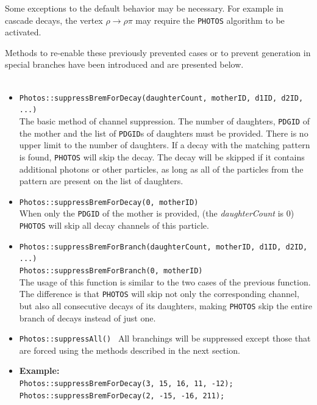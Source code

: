 \documentclass[]{Photos_interface_design}
\begin{document}
Some exceptions to the default behavior may be necessary. For example
in cascade decays, the vertex $\rho \to \rho \pi$ may require the
{\tt PHOTOS} algorithm to be activated.

Methods to re-enable these previously prevented cases or to prevent generation in special
branches have been introduced and are presented below. \\ \\ 


\begin{itemize}
 \item {\tt Photos::suppressBremForDecay(daughterCount, motherID, d1ID, d2ID, ...)} \hfill \\
       The basic method of channel suppression. The number of daughters,
	   {\tt PDGID} of the mother and the list of {\tt PDGID}s of daughters must be provided.
	   There is no upper limit to the number of daughters.
	   If a decay with the matching pattern is found, {\tt PHOTOS} will skip the decay.
           The decay will be skipped if it contains additional photons or other particles,
           as long as all of the particles from the pattern are present on the list of daughters.
 \item {\tt Photos::suppressBremForDecay(0, motherID)} \hfill \\
       When only the {\tt PDGID} of the mother is provided, (the {\it daughterCount} is 0) {\tt PHOTOS} will skip all decay channels
	   of this particle. 
 \item {\tt Photos::suppressBremForBranch(daughterCount, motherID, d1ID, d2ID, ...)} \hfill \\
       {\tt Photos::suppressBremForBranch(0, motherID)} \hfill \\
       The usage of this function is similar to the two cases of the previous function. The difference is
	   that {\tt PHOTOS} will skip not only the corresponding channel,
	   but also all consecutive decays of its daughters, making {\tt PHOTOS} skip the entire branch
	   of decays instead of just one.
 \item {\tt Photos::suppressAll() }
       All branchings will be suppressed except those that are forced using the methods
	   described in the next section.
 \item \textbf{Example:} \hfill \\
{\tt Photos::suppressBremForDecay(3, 15, 16, 11, -12); } \\
{\tt Photos::suppressBremForDecay(2, -15, -16, 211); } \\

\end{itemize}
\end{document}
